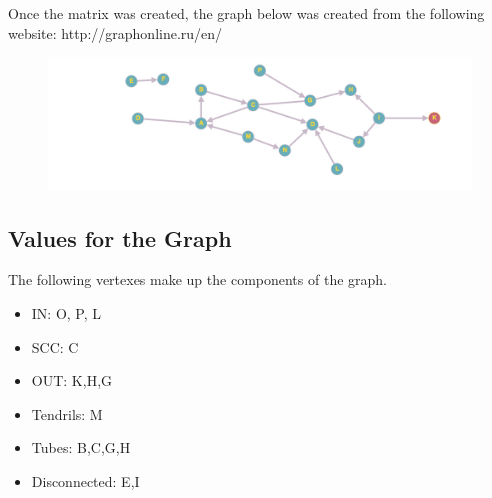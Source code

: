 \documentclass[a4paper,12pt]{article}
\begin{document}
Once the matrix was created, the graph below was created from the following website: http://graphonline.ru/en/ \\ 
\begin{figure}[h]
\centering
\includegraphics[width=15cm]{graph}
\end{figure}
\newpage 
\subsection{Values for the Graph}
The following vertexes make up the components of the graph.
\begin{itemize}
    \item IN: O, P, L
    \item SCC: C
    \item OUT: K,H,G
    \item Tendrils: M
    \item Tubes: B,C,G,H
    \item Disconnected: E,I
\end{itemize}
\end{document}
